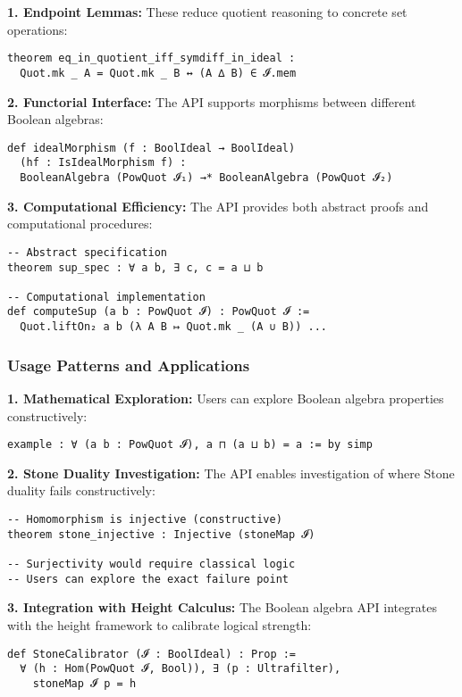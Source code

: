 \documentclass[11pt]{article}
\theoremstyle{plain}
\theoremstyle{definition}
\begin{document}
\textbf{1. Endpoint Lemmas:} These reduce quotient reasoning to concrete set operations:
\begin{verbatim}
theorem eq_in_quotient_iff_symdiff_in_ideal :
  Quot.mk _ A = Quot.mk _ B ↔ (A ∆ B) ∈ 𝓘.mem
\end{verbatim}

\textbf{2. Functorial Interface:} The API supports morphisms between different Boolean algebras:
\begin{verbatim}
def idealMorphism (f : BoolIdeal → BoolIdeal) 
  (hf : IsIdealMorphism f) :
  BooleanAlgebra (PowQuot 𝓘₁) →* BooleanAlgebra (PowQuot 𝓘₂)
\end{verbatim}

\textbf{3. Computational Efficiency:} The API provides both abstract proofs and computational procedures:
\begin{verbatim}
-- Abstract specification
theorem sup_spec : ∀ a b, ∃ c, c = a ⊔ b

-- Computational implementation  
def computeSup (a b : PowQuot 𝓘) : PowQuot 𝓘 :=
  Quot.liftOn₂ a b (λ A B ↦ Quot.mk _ (A ∪ B)) ...
\end{verbatim}

\subsubsection{Usage Patterns and Applications}

\textbf{1. Mathematical Exploration:}
Users can explore Boolean algebra properties constructively:
\begin{verbatim}
example : ∀ (a b : PowQuot 𝓘), a ⊓ (a ⊔ b) = a := by simp
\end{verbatim}

\textbf{2. Stone Duality Investigation:}
The API enables investigation of where Stone duality fails constructively:
\begin{verbatim}
-- Homomorphism is injective (constructive)
theorem stone_injective : Injective (stoneMap 𝓘)

-- Surjectivity would require classical logic
-- Users can explore the exact failure point
\end{verbatim}

\textbf{3. Integration with Height Calculus:}
The Boolean algebra API integrates with the height framework to calibrate logical strength:
\begin{verbatim}
def StoneCalibrator (𝓘 : BoolIdeal) : Prop :=
  ∀ (h : Hom(PowQuot 𝓘, Bool)), ∃ (p : Ultrafilter), 
    stoneMap 𝓘 p = h
\end{verbatim}
\end{document}

